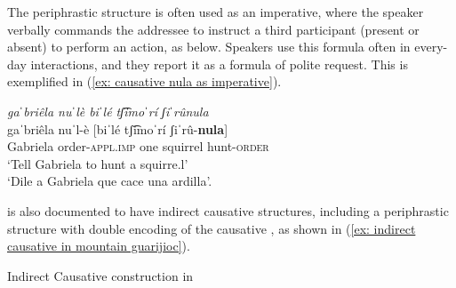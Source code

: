\z

The periphrastic structure is often used as an imperative, where the speaker verbally commands the addressee to instruct a third participant (present or absent) to perform an action, as below. Speakers use this formula often in every-day interactions, and they report it as a formula of polite request. This is exemplified in (\ref{ex: causative nula as imperative}).

\ea\label{ex: causative nula as imperative}

\textit{gaˈbriêla nuˈlè biˈlé tʃ͡imoˈrí  ʃiˈrûnula}\\
\gll    gaˈbriêla nuˈl-è [biˈlé tʃ͡imoˈrí  ʃiˈrû-\textbf{nula}]\\
        Gabriela order\textsc{-appl.imp} one  squirrel  hunt-\textsc{{order}}\\
\glt    `Tell Gabriela to hunt a squirre.l’\\
\glt    `Dile a Gabriela que cace una ardilla’.\\

\z

 is also documented to have indirect causative structures, including a periphrastic structure with double encoding of the causative \citep[]{miller1996guarijio}, as shown in (\ref{ex: indirect causative in mountain guarijioc}).


\newpage
\ea\label{ex: indirect causative in mountain guarijio}
{Indirect Causative construction in  \citep[219]{miller1996guarijio}}


